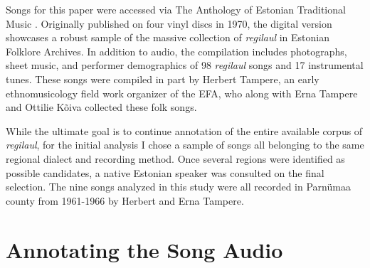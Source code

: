 Songs for this paper were accessed via The Anthology of Estonian Traditional Music \citep{tampere2016}. Originally published on four vinyl discs in 1970, the digital version showcases a robust sample of the massive collection of {\it regilaul} in Estonian Folklore Archives. In addition to audio, the  compilation includes  photographs, sheet music, and performer demographics of 98 {\it regilaul} songs and 17 instrumental tunes. 
These songs were compiled in part by Herbert Tampere, an early ethnomusicology field work organizer of the EFA, who along with Erna Tampere and Ottilie Kõiva collected these folk songs\citep{oras2002, tampere2016}. 
%
%


While the ultimate goal is to continue annotation of the entire available corpus of {\it regilaul}, for the initial analysis I chose a sample of songs all belonging to the same regional dialect and recording method. Once several regions were identified as possible candidates, a native Estonian speaker was consulted on the final selection. The nine songs analyzed in this study were all recorded in Parnümaa county from 1961-1966 by Herbert and Erna Tampere. 


\section{Annotating the Song Audio }

